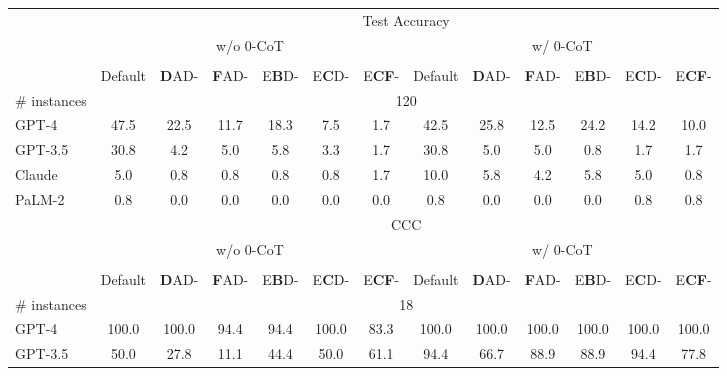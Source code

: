 \begin{table}[t!]
    \centering
    \footnotesize
    \begin{tabular}{lcccccccccccc}
    \toprule 
     & \multicolumn{12}{c}{Test Accuracy} \\ \cmidrule(lr){2-13}
     & \multicolumn{6}{c}{w/o 0-CoT} & \multicolumn{6}{c}{w/ 0-CoT} \\
     \cmidrule(lr){2-7} \cmidrule(lr){8-13} \\
     & Default & \textbf{D}AD- & \textbf{F}AD- & E\textbf{B}D- & E\textbf{C}D- & E\textbf{CF}- & Default & \textbf{D}AD- & \textbf{F}AD- & E\textbf{B}D- & E\textbf{C}D- & E\textbf{CF}- \\
     \midrule
     \# instances & \multicolumn{12}{c}{120} \\
    \midrule
    GPT-4 & 47.5 & 22.5 & 11.7 & 18.3 & 7.5 & 1.7 & 42.5 & 25.8 & 12.5 & 24.2 & 14.2 & 10.0 \\
    GPT-3.5 & 30.8 & \phantom{0}4.2 & \phantom{0}5.0 & \phantom{0}5.8 & 3.3 & 1.7 & 30.8 & \phantom{0}5.0 & \phantom{0}5.0 & \phantom{0}0.8 & \phantom{0}1.7 & \phantom{0}1.7 \\
    Claude & \phantom{0}5.0 & \phantom{0}0.8 & \phantom{0}0.8 & \phantom{0}0.8 & 0.8 & 1.7 & 10.0 & \phantom{0}5.8 & \phantom{0}4.2 & \phantom{0}5.8 & \phantom{0}5.0 & \phantom{0}0.8 \\
    PaLM-2 & \phantom{0}0.8 & \phantom{0}0.0 & \phantom{0}0.0 & \phantom{0}0.0 & 0.0 & 0.0 & \phantom{0}0.8 & \phantom{0}0.0 & \phantom{0}0.0 & \phantom{0}0.0 & \phantom{0}0.8 & \phantom{0}0.8 \\
    \midrule
     & \multicolumn{12}{c}{CCC} \\ \cmidrule(lr){2-13} & \multicolumn{6}{c}{w/o 0-CoT} & \multicolumn{6}{c}{w/ 0-CoT} \\
     \cmidrule(lr){2-7} \cmidrule(lr){8-13} \\
     & Default & \textbf{D}AD- & \textbf{F}AD- & E\textbf{B}D- & E\textbf{C}D- & E\textbf{CF}- & Default & \textbf{D}AD- & \textbf{F}AD- & E\textbf{B}D- & E\textbf{C}D- & E\textbf{CF}- \\
     \midrule
     \# instances & \multicolumn{12}{c}{18} \\
    \midrule
    GPT-4 & 100.0 & 100.0 & 94.4 & 94.4 & 100.0 & 83.3 & 100.0 & 100.0 & 100.0 & 100.0 & 100.0 & 100.0 \\
    GPT-3.5 & \phantom{0}50.0 & \phantom{0}27.8 & 11.1 & 44.4 & \phantom{0}50.0 & 61.1 & \phantom{0}94.4 & \phantom{0}66.7 & \phantom{0}88.9 & \phantom{0}88.9 & \phantom{0}94.4 & \phantom{0}77.8 \\

\end{tabular}
\end{table}
